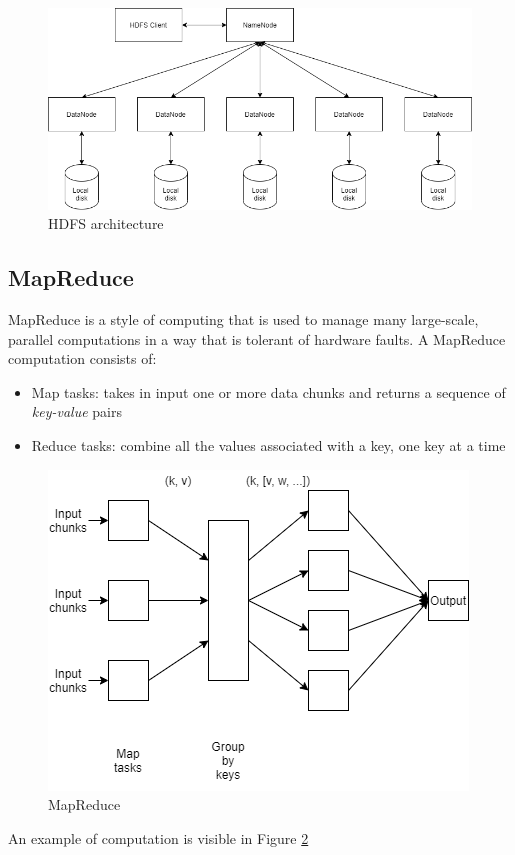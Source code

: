 \documentclass[\main/main.tex]{subfiles}
\begin{document}
\begin{figure}[h]
    \centering
    \includegraphics[scale=0.35]{images/cluster_computing/hdfs_architecture.png}
    \caption{HDFS  architecture}
    \label{fig:hdfs_architecture}
\end{figure}
\subsection{MapReduce}
MapReduce is a style of computing that is used to manage many large-scale, parallel computations in a way that is tolerant of hardware faults. A MapReduce computation consists of:
\begin{itemize}
    \item Map tasks: takes in input one or more data chunks and returns a sequence of \textit{key-value} pairs
    \item Reduce tasks: combine all the values associated with a key, one key at a time
\end{itemize}
\begin{figure}[h]
    \centering
    \includegraphics[scale=0.35]{images/cluster_computing/map_reduce_schema.png}
    \caption{MapReduce}
    \label{fig:map_reduce}
\end{figure}
An example of computation is visible in Figure \ref{fig:map_reduce}
\end{document}
